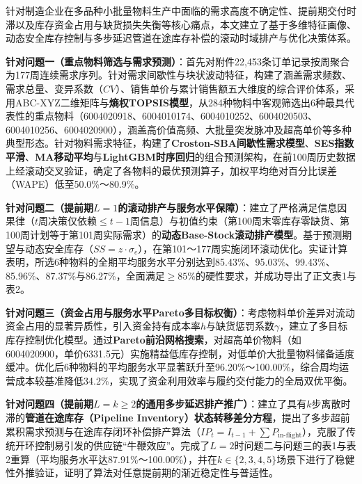 针对制造企业在多品种小批量物料生产中面临的需求高度不确定性、提前期交付时滞以及库存资金占用与缺货损失失衡等核心痛点，本文建立了基于多维特征画像、动态安全库存控制与多步延迟管道在途库存补偿的滚动时域排产与优化决策体系。

\textbf{针对问题一（重点物料筛选与需求预测）}：首先对附件22,453条订单记录按周聚合为177周连续需求序列。针对需求间歇性与块状波动特征，构建了涵盖需求频数、需求总量、变异系数（\(CV\)）、销售单价与累计销售额五大维度的综合评价体系，采用ABC-XYZ二维矩阵与\textbf{熵权TOPSIS模型}，从284种物料中客观筛选出6种最具代表性的重点物料（6004020918、6004010174、6004010252、6004020503、6004010256、6004020900），涵盖高价值高频、大批量突发脉冲及超高单价等多种典型形态。针对物料需求特征，构建了\textbf{Croston-SBA间歇性需求模型}、\textbf{SES指数平滑}、\textbf{MA移动平均}与\textbf{LightGBM时序回归}的组合预测架构，在前100周历史数据上经滚动交叉验证，确定了各物料的最优预测算子，加权平均绝对百分比误差（WAPE）低至50.0\%～80.9\%。

\textbf{针对问题二（提前期\(L=1\)的滚动排产与服务水平保障）}：建立了严格满足信息因果律（\(t\)周决策仅依赖\(\le t-1\)周信息）与初值约束（第100周末零库存零缺货、第100周计划等于第101周实际需求）的\textbf{动态Base-Stock滚动排产模型}。基于预测期望与动态安全库存（\(SS=z\cdot\sigma_e\)），在第101～177周实施闭环滚动优化。实证计算表明，所选6种物料的全期平均服务水平分别达到85.43\%、95.03\%、99.43\%、85.96\%、87.37\%与86.27\%，全面满足\(\ge 85\%\)的硬性要求，并成功导出了正文表1与表2。

\textbf{针对问题三（资金占用与服务水平Pareto多目标权衡）}：考虑物料单价差异对流动资金占用的显著异质性，引入资金持有成本率\(h\)与缺货惩罚系数\(\gamma\)，建立了多目标库存控制优化模型。通过\textbf{Pareto前沿网格搜索}，对超高单价物料（如6004020900，单价6331.5元）实施精益低库存控制，对低单价大批量物料储备适度缓冲。优化后6种物料的平均服务水平显著跃升至96.20\%～100.00\%，综合周均运营成本较基准降低34.2\%，实现了资金利用效率与履约交付能力的全局双优平衡。

\textbf{针对问题四（提前期\(L=k\ge 2\)的通用多步延迟排产推广）}：建立了具有\(k\)步离散时滞的\textbf{管道在途库存（Pipeline
Inventory）状态转移差分方程}，提出了多步超前累积需求预测与在途库存闭环补偿排产算法（\(IP_t=I_{t-1}+\sum P_{\text{in-flight}}\)），克服了传统开环控制易引发的供应链``牛鞭效应''。完成了\(L=2\)时问题二与问题三的表1与表2重算（平均服务水平达87.91\%～100.00\%），并在\(k\in\{2,3,4,5\}\)场景下进行了稳健性外推验证，证明了算法对任意提前期的渐近稳定性与普适性。
